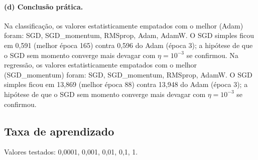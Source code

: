 \documentclass[11pt,a4paper]{article}
\begin{document}
\paragraph{(d) Conclusão prática.} Na classificação, os valores estatisticamente empatados com o melhor (Adam) foram: SGD, SGD\_momentum, RMSprop, Adam, AdamW. O SGD simples ficou em 0,591 (melhor época 165) contra 0,596 do Adam (época 3); a hipótese de que o SGD sem momento converge mais devagar com $\eta=10^{-3}$ se confirmou. Na regressão, os valores estatisticamente empatados com o melhor (SGD\_momentum) foram: SGD, SGD\_momentum, RMSprop, AdamW. O SGD simples ficou em 13,869 (melhor época 88) contra 13,948 do Adam (época 3); a hipótese de que o SGD sem momento converge mais devagar com $\eta=10^{-3}$ se confirmou.

\subsection{Taxa de aprendizado}
Valores testados: 0,0001, 0,001, 0,01, 0,1, 1.
\end{document}

